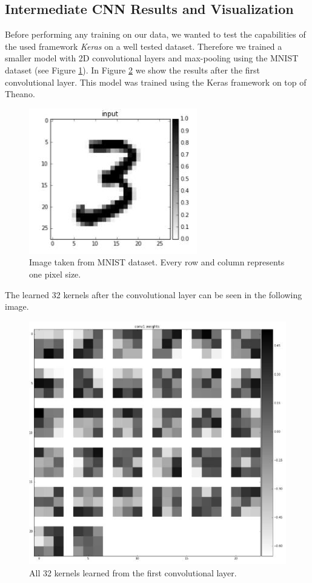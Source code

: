 \documentclass[	DIV=calc,%
				paper=a4,%
				fontsize=11pt,%
				twocolumn]{scrartcl}	 %
\begin{document}
\subsection*{Intermediate CNN Results and Visualization}

Before performing any training on our data, we wanted to test the capabilities of the used framework \textit{Keras} \cite{keras_page} on a well tested dataset. Therefore we trained a smaller model with 2D convolutional layers and max-pooling using the MNIST \cite{mnist} dataset (see Figure \ref{cnn_results_2}). In Figure \ref{cnn_results_3} we show the results after the first convolutional layer. This model was trained using the Keras framework on top of Theano.

\begin{figure}[H]
    \centering
    \includegraphics[width=0.8\linewidth]{data/cnn_results_2.png}
    \caption{Image taken from MNIST dataset. Every row and column represents one pixel size.}
    \label{cnn_results_2}
\end{figure}

The learned 32 kernels after the convolutional layer can be seen in the following image. 

\begin{figure}[H]
    \centering
    \includegraphics[width=0.8\linewidth]{data/cnn_results_3.png}
    \caption{All 32 kernels learned from the first convolutional layer.}
    \label{cnn_results_3}
\end{figure}
\end{document}
